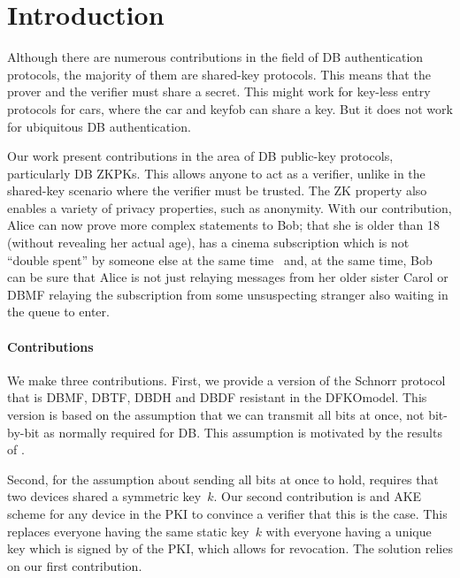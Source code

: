 \section{Introduction}%
\label{Introduction}

Although there are numerous contributions in the field of \ac{DB} 
authentication protocols, the majority of them are shared-key protocols.
This means that the prover and the verifier must share a secret.
This might work for key-less entry protocols for cars, where the car and keyfob 
can share a key.
But it does not work for ubiquitous \ac{DB} authentication.

Our work present contributions in the area of \ac{DB} public-key protocols, 
particularly \ac{DB} \acp{ZKPK}.
This allows anyone to act as a verifier, unlike in the shared-key scenario 
where the verifier must be trusted.
The \ac{ZK} property also enables a variety of privacy properties, such as 
anonymity.
With our contribution, Alice can
now prove more complex statements to Bob; \eg that she is older than 18 
(without revealing her actual age), has a cinema subscription which is not 
\enquote{double spent} by someone else at the same time~\cite[\eg][]{AnonPass} 
and, at the same time, Bob can be sure that Alice is not just relaying messages 
from her older sister Carol or \ac{DBMF} relaying the subscription from some 
unsuspecting stranger also waiting in the queue to enter.



\paragraph*{Contributions}

We make three contributions.
First, we provide a version of the Schnorr protocol that is \ac{DBMF}, 
\ac{DBTF}, \ac{DBDH} and \ac{DBDF} resistant in the \ac{DFKOmodel}.
This version is based on the assumption that we can transmit all bits at once, 
not bit-by-bit as normally required for \ac{DB}.
This assumption is motivated by the results of \textcite{UWBPR}.

Second, for the assumption about sending all bits at once to hold, 
\textcite{UWBPR} requires that two devices shared a symmetric key~\(k\).
Our second contribution is  and \ac{AKE} scheme for any device in 
the \ac{PKI} to convince a verifier that this is the case.
This replaces everyone having the same static key~\(k\) with everyone having a 
unique key which is signed by  of the \ac{PKI}, which allows for 
revocation.
The solution relies on our first contribution.

